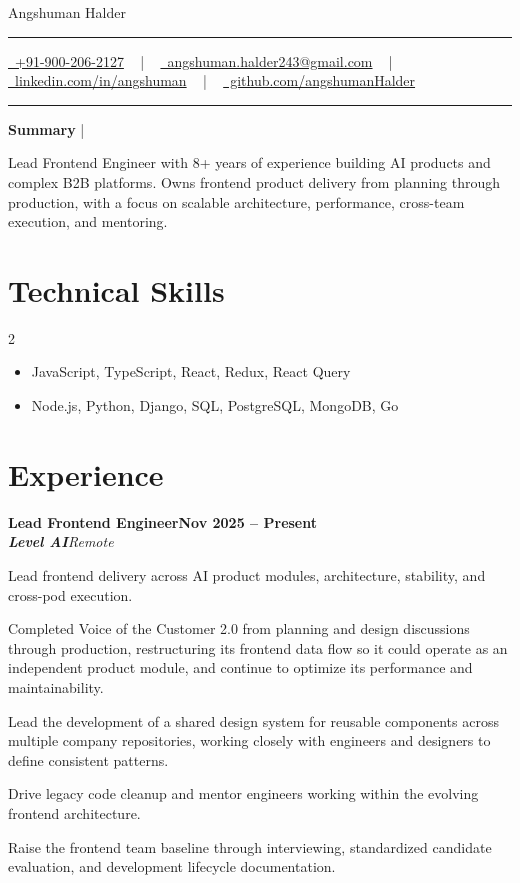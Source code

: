 \documentclass[10pt, letterpaper]{article}
\newcommand{\documentTitle}[2]{
  \begin{center}
    {\Huge\color{accentTitle} #1}
    \vspace{10pt}
    {\color{accentLine} \hrule}
    \vspace{2pt}
    \footnotesize{#2}
    \vspace{2pt}
    {\color{accentLine} \hrule}
  \end{center}
}
\newcommand{\tinysection}[1]{
  \phantomsection
  \addcontentsline{toc}{section}{#1}
  {\large{\bfseries\color{accentText}#1} {\color{accentLine} |}}
}
\newcommand{\heading}[2]{
  \hspace{10pt}#1\hfill#2\\
}
\newcommand{\headingBf}[2]{
  \heading{\textbf{#1}}{\textbf{#2}}
}
\newcommand{\headingIt}[2]{
  \heading{\textit{#1}}{\textit{#2}}
}
\newenvironment{resume_list}{
  \vspace{-1pt}
  \begin{itemize}[itemsep=1px, parsep=1pt, leftmargin=30pt]
}{
  \end{itemize}
}
\begin{document}
  \documentTitle{Angshuman Halder}{
    \href{tel:+919002062127}{
      \raisebox{-0.05\height} \faPhone\ +91-900-206-2127} ~ | ~
    \href{mailto:angshuman.halder243@gmail.com}{
      \raisebox{-0.15\height} \faEnvelope\ angshuman.halder243@gmail.com} ~ | ~
    \href{https://www.linkedin.com/in/angshuman-halder-159184119/}{
      \raisebox{-0.15\height} \faLinkedin\ linkedin.com/in/angshuman} ~ | ~
    \href{https://github.com/angshumanHalder}{
      \raisebox{-0.15\height} \faGithub\ github.com/angshumanHalder}
  }

  \tinysection{Summary}
  Lead Frontend Engineer with 8+ years of experience building AI products and complex B2B platforms. Owns frontend product delivery from planning through production, with a focus on scalable architecture, performance, cross-team execution, and mentoring.

  \section{Technical Skills}

  \begin{multicols}{2}
    \begin{itemize}[itemsep=-2px, parsep=1pt, leftmargin=75pt]
      \item[\textbf{Front-end}] JavaScript, TypeScript, React, Redux, React Query
      \item[\textbf{Full-stack}] Node.js, Python, Django, SQL, PostgreSQL, MongoDB, Go
    \end{itemize}
  \end{multicols}

  \section{Experience}

  \headingBf{Lead Frontend Engineer}{Nov 2025 -- Present}
  \headingIt{\textbf{Level AI}}{Remote}
  \vspace{1pt}
  \begin{resume_list}
    \item Lead frontend delivery across AI product modules, architecture, stability, and cross-pod execution.
    \item Completed Voice of the Customer 2.0 from planning and design discussions through production, restructuring its frontend data flow so it could operate as an independent product module, and continue to optimize its performance and maintainability.
    \item Lead the development of a shared design system for reusable components across multiple company repositories, working closely with engineers and designers to define consistent patterns.
    \item Drive legacy code cleanup and mentor engineers working within the evolving frontend architecture.
    \item Raise the frontend team baseline through interviewing, standardized candidate evaluation, and development lifecycle documentation.
  \end{resume_list}
\end{document}
